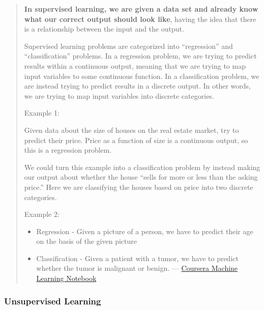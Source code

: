 \documentclass[]{book}
\begin{document}
\begin{quote}
\textbf{In supervised learning, we are given a data set and already know
what our correct output should look like}, having the idea that there is
a relationship between the input and the output.

Supervised learning problems are categorized into ``regression'' and
``classification'' problems. In a regression problem, we are trying to
predict results within a continuous output, meaning that we are trying
to map input variables to some continuous function. In a classification
problem, we are instead trying to predict results in a discrete output.
In other words, we are trying to map input variables into discrete
categories.

Example 1:

Given data about the size of houses on the real estate market, try to
predict their price. Price as a function of size is a continuous output,
so this is a regression problem.

We could turn this example into a classification problem by instead
making our output about whether the house ``sells for more or less than
the asking price.'' Here we are classifying the houses based on price
into two discrete categories.

Example 2:

\begin{itemize}
\item
  Regression - Given a picture of a person, we have to predict their age
  on the basis of the given picture
\item
  Classification - Given a patient with a tumor, we have to predict
  whether the tumor is malignant or benign. ---
  \href{https://www.coursera.org/learn/machine-learning}{Coursera
  Machine Learning Notebook}
\end{itemize}
\end{quote}

\subsubsection*{Unsupervised Learning}\label{unsupervised-learning}
\end{document}
